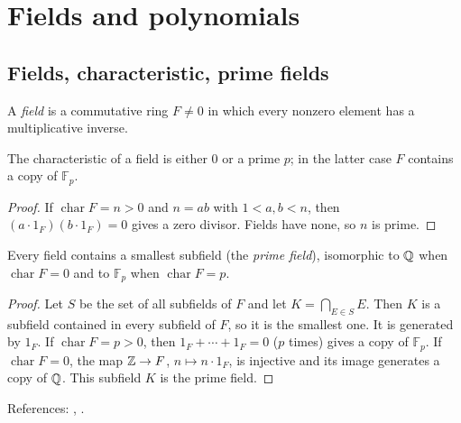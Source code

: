 \section{Fields and polynomials}\label{sec:fields-polynomials}

\subsection{Fields, characteristic, prime fields}
\begin{definition}
A \emph{field} is a commutative ring $F\neq 0$ in which every nonzero element has a multiplicative inverse.
\end{definition}
\begin{proposition}[Characteristic]\label{prop:char}
The characteristic of a field is either $0$ or a prime $p$; in the latter case $F$ contains a copy of $\mathbb{F}_p$.
\end{proposition}
\begin{proof}
If $\operatorname{char}F=n>0$ and $n=ab$ with $1<a,b<n$, then $(a\cdot1_F)(b\cdot1_F)=0$ gives a zero divisor. Fields have none, so $n$ is prime.
\end{proof}
\begin{proposition}
Every field contains a smallest subfield (the \emph{prime field}), isomorphic to $\mathbb{Q}$ when $\operatorname{char}F=0$ and to $\mathbb{F}_p$ when $\operatorname{char}F=p$.
\end{proposition}
\begin{proof}
Let $S$ be the set of all subfields of $F$ and let $K=\bigcap_{E\in S}E$. Then $K$ is a subfield contained in every subfield of $F$, so it is the smallest one. It is generated by $1_F$. If $\operatorname{char}F=p>0$, then $1_F+\cdots+1_F=0$ ($p$ times) gives a copy of $\mathbb{F}_p$. If $\operatorname{char}F=0$, the map $\mathbb{Z}\to F$, $n\mapsto n\cdot1_F$, is injective and its image generates a copy of $\mathbb{Q}$. This subfield $K$ is the prime field.
\end{proof}
References: \cite[\S13]{DF}, \cite[Ch.~I]{Artin}.

